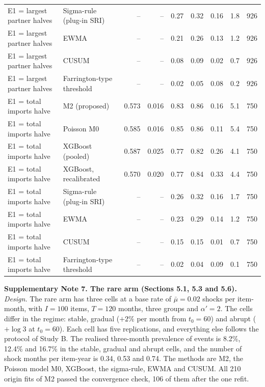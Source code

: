 \documentclass[10pt,a4paper]{article}
\begin{document}
\begin{minipage}{\linewidth}
\begin{tabular}{llrrrrrrr}
E1 = largest partner halves & Sigma-rule (plug-in SRI) & -- & -- & 0.27 & 0.32 & 0.16 & 1.8 & 926 \\
E1 = largest partner halves & EWMA & -- & -- & 0.21 & 0.26 & 0.13 & 1.2 & 926 \\
E1 = largest partner halves & CUSUM & -- & -- & 0.08 & 0.09 & 0.02 & 0.7 & 926 \\
E1 = largest partner halves & Farrington-type threshold & -- & -- & 0.02 & 0.05 & 0.08 & 0.2 & 926 \\
E1 = total imports halve & M2 (proposed) & 0.573 & 0.016 & 0.83 & 0.86 & 0.16 & 5.1 & 750 \\
E1 = total imports halve & Poisson M0 & 0.585 & 0.016 & 0.85 & 0.86 & 0.11 & 5.4 & 750 \\
E1 = total imports halve & XGBoost (pooled) & 0.587 & 0.025 & 0.77 & 0.82 & 0.26 & 4.1 & 750 \\
E1 = total imports halve & XGBoost, recalibrated & 0.570 & 0.020 & 0.77 & 0.84 & 0.33 & 4.4 & 750 \\
E1 = total imports halve & Sigma-rule (plug-in SRI) & -- & -- & 0.26 & 0.32 & 0.16 & 1.7 & 750 \\
E1 = total imports halve & EWMA & -- & -- & 0.23 & 0.29 & 0.14 & 1.2 & 750 \\
E1 = total imports halve & CUSUM & -- & -- & 0.15 & 0.15 & 0.01 & 0.7 & 750 \\
E1 = total imports halve & Farrington-type threshold & -- & -- & 0.02 & 0.04 & 0.09 & 0.1 & 750 \\
\bottomrule
\end{tabular}
\end{minipage}
\vspace{8pt}

\textbf{Supplementary Note 7. The rare arm (Sections 5.1, 5.3 and 5.6).}
\textit{Design.} The rare arm has three cells at a base rate of $\bar{\mu} = 0.02$ shocks per item-month, with $I = 100$ items, $T = 120$ months, three groups and $\alpha' = 2$. The cells differ in the regime: stable, gradual ($+2\%$ per month from $t_0 = 60$) and abrupt ($+\log 3$ at $t_0 = 60$). Each cell has five replications, and everything else follows the protocol of Study B. The realised three-month prevalence of events is 8.2\%, 12.4\% and 16.7\% in the stable, gradual and abrupt cells, and the number of shock months per item-year is 0.34, 0.53 and 0.74. The methods are M2, the Poisson model M0, XGBoost, the sigma-rule, EWMA and CUSUM. All 210 origin fits of M2 passed the convergence check, 106 of them after the one refit.
\end{document}
